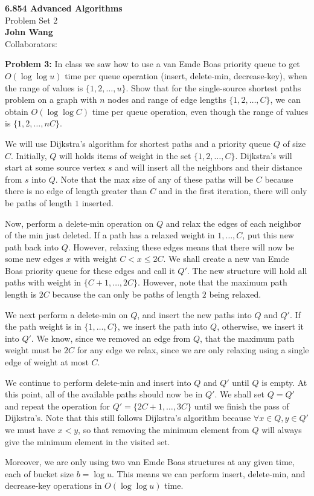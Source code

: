 \documentclass[psamsfonts]{amsart}
\newenvironment{sol}{\vspace{0.25cm}{\large \bfseries Solution:}}{\qedsymbol}
\newenvironment{prob}[1]{\begin{framed}{\large \bfseries Problem #1:}}{\end{framed}}
\newcommand{\makenewtitle}{
\begin{center}
{\huge \bfseries 6.854 Advanced Algorithms} \\
Problem Set 2\\
\vspace{0.25cm}
{\bfseries John Wang} \\
Collaborators:
\end{center}
\vspace{0.5cm}
}
\begin{document}
\newpage
\makenewtitle
\begin{prob}{3}
In class we saw how to use a van Emde Boas priority queue to get $O(\log \log u)$ time per queue operation (insert, delete-min, decrease-key), when the range of values is $\{1, 2, \ldots, u\}$. Show that for the single-source shortest paths problem on a graph with $n$ nodes and range of edge lengths $\{1,2,\ldots, C\}$, we can obtain $O(\log \log C)$ time per queue operation, even though the range of values is $\{1,2,\ldots, nC\}$. 
\end{prob}

\begin{sol}
We will use Dijkstra's algorithm for shortest paths and a priority queue $Q$ of size $C$. Initially, $Q$ will holds items of weight in the set $\{1,2,\ldots, C\}$. Dijkstra's will start at some source vertex $s$ and will insert all the neighbors and their distance from $s$ into $Q$. Note that the max size of any of these paths will be $C$ because there is no edge of length greater than $C$ and in the first iteration, there will only be paths of length $1$ inserted. 

Now, perform a delete-min operation on $Q$ and relax the edges of each neighbor of the min just deleted. If a path has a relaxed weight in $1, \ldots, C$, put this new path back into $Q$. However, relaxing these edges means that there will now be some new edges $x$ with weight $C < x \leq 2C$. We shall create a new van Emde Boas priority queue for these edges and call it $Q'$. The new structure will hold all paths with weight in $\{C+1, \ldots, 2C\}$. However, note that the maximum path length is $2C$ because the can only be paths of length $2$ being relaxed.

We next perform a delete-min on $Q$, and insert the new paths into $Q$ and $Q'$. If the path weight is in $\{1, \ldots, C\}$, we insert the path into $Q$, otherwise, we insert it into $Q'$. We know, since we removed an edge from $Q$, that the maximum path weight must be $2C$ for any edge we relax, since we are only relaxing using a single edge of weight at most $C$. 

We continue to perform delete-min and insert into $Q$ and $Q'$ until $Q$ is empty. At this point, all of the available paths should now be in $Q'$. We shall set $Q = Q'$ and repeat the operation for $Q' = \{2C+1, \ldots, 3C\}$ until we finish the pass of Dijkstra's. Note that this still follows Dijkstra's algorithm because $\forall x \in Q, y \in Q'$ we must have $x < y$, so that removing the minimum element from $Q$ will always give the minimum element in the visited set. 

Moreover, we are only using two van Emde Boas structures at any given time, each of bucket size $b = \log u$. This means we can perform insert, delete-min, and decrease-key operations in $O(\log \log u)$ time.
\end{sol}
\end{document}
